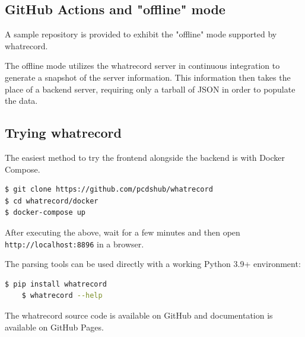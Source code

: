 \documentclass[letter,
               keeplastbox,   %
               ]{jacow}
\begin{document}
\subsection{GitHub Actions and "offline" mode}

A sample repository\cite{gha-sample} is provided to exhibit the "offline" mode
supported by whatrecord.

The offline mode utilizes the whatrecord server in continuous integration to
generate a snapshot of the server information. This information then takes
the place of a backend server, requiring only a tarball of JSON in order to
populate the data.

\subsection{Trying whatrecord}

The easiest method to try the frontend alongside the backend is with Docker
Compose.

\begin{lstlisting}[language=bash]
$ git clone https://github.com/pcdshub/whatrecord
$ cd whatrecord/docker
$ docker-compose up
\end{lstlisting}
After executing the above, wait for a few minutes and then open
\verb_http://localhost:8896_ in a browser.

The parsing tools can be used directly with a working Python 3.9+ environment:

\begin{lstlisting}[language=bash]
	$ pip install whatrecord
	$ whatrecord --help
\end{lstlisting}

The whatrecord source code is available on GitHub\cite{whatrecord-github}
and documentation is available on GitHub Pages\cite{whatrecord-docs}.
\end{document}
